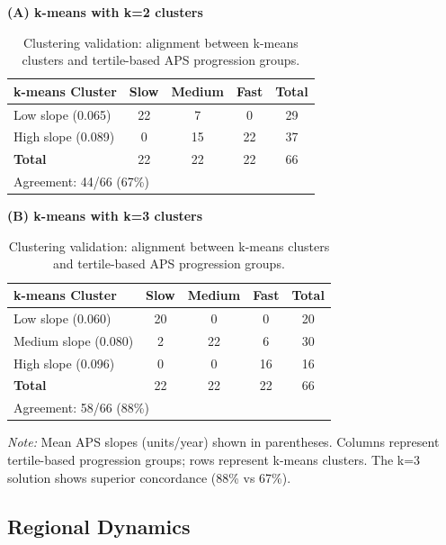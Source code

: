 \documentclass[conference]{IEEEtran}
\begin{document}
\begin{table}[!htbp]
\caption{Clustering validation: alignment between k-means clusters and tertile-based APS progression groups.}
\label{tab:longit_clustering}
\centering
\footnotesize
\textbf{(A) k-means with k=2 clusters}

\begin{tabular}{lccc|c}
\hline
\textbf{k-means Cluster} & \textbf{Slow} & \textbf{Medium} & \textbf{Fast} & \textbf{Total} \\
\hline
Low slope (0.065)  & 22 & 7  & 0  & 29 \\
High slope (0.089) & 0  & 15 & 22 & 37 \\
\hline
\textbf{Total}     & 22 & 22 & 22 & 66 \\
\hline
\multicolumn{5}{l}{\footnotesize Agreement: 44/66 (67\%)} \\
\end{tabular}

\textbf{(B) k-means with k=3 clusters}

\begin{tabular}{lccc|c}
\hline
\textbf{k-means Cluster} & \textbf{Slow} & \textbf{Medium} & \textbf{Fast} & \textbf{Total} \\
\hline
Low slope (0.060)    & 20 & 0  & 0  & 20 \\
Medium slope (0.080) & 2  & 22 & 6  & 30 \\
High slope (0.096)   & 0  & 0  & 16 & 16 \\
\hline
\textbf{Total}       & 22 & 22 & 22 & 66 \\
\hline
\multicolumn{5}{l}{\footnotesize Agreement: 58/66 (88\%)} \\
\end{tabular}

\scriptsize
\textit{Note:} Mean APS slopes (units/year) shown in parentheses. Columns represent tertile-based progression groups; rows represent k-means clusters. The k=3 solution shows superior concordance (88\% vs 67\%).
\end{table}

\subsection{Regional Dynamics}\label{refdyn}
\end{document}

